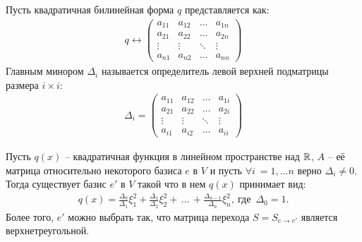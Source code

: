 \begin{definition}
    Пусть квадратичная билинейная форма $q$ представляется как: \begin{gather*}
        q \leftrightarrow \begin{pmatrix}
        a_{11} & a_{12} & \dots  & a_{1n}   \\
        a_{21} & a_{22} & \dots  & a_{2n}   \\
        \vdots & \vdots & \ddots & \vdots   \\
        a_{n1} & a_{n2} & \dots  & a_{nn}
        \end{pmatrix}
    \end{gather*}
    Главным минором $\Delta_i$ называется определитель левой верхней подматрицы размера $i \times i$:
    \begin{gather*}
        \Delta_i = \begin{pmatrix}
            a_{11} & a_{12} & \dots  & a_{1i}   \\
            a_{21} & a_{22} & \dots  & a_{2i}   \\
            \vdots & \vdots & \ddots & \vdots   \\
            a_{i1} & a_{i2} & \dots  & a_{ii}
        \end{pmatrix}
    \end{gather*} 
\end{definition}

\begin{theorem}[Як\'{о}би]
    Пусть $q(x)$ -- квадратичная функция в линейном пространстве над $\mathbb{R}$, $A$ -- её матрица относительно 
    некоторого базиса $e$ в $V$ и пусть $\forall i \: = 1, \dots n$ верно $\Delta_i \neq 0$. Тогда 
    существует базис $e'$ в $V$ такой что в нем $q(x)$ принимает вид: 
    \begin{gather*}
        q(x) = \frac{\Delta_0}{\Delta_1} \xi_1^2 + \frac{\Delta_1}{\Delta_2} \xi_2^2 + \, \dots \,+ 
        \frac{\Delta_{n-1}}{\Delta_n} \xi_n^2, \: \text{где } \, \Delta_0 = 1. 
    \end{gather*}
    Более того, $e'$ можно выбрать так, что матрица перехода $S = S_{e \to e'}$ 
    является верхнетреугольной. 
\end{theorem}

